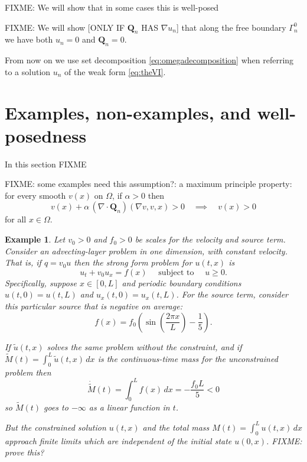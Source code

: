 \documentclass[final,leqno,onefignum,onetabnum]{siamltex1213bueler}
\newtheorem{example}{Example}
\newcommand\bQ{\mathbf{Q}}
\newcommand{\Div}{\nabla\cdot}
\renewcommand{\grad}{\nabla}
\begin{document}
\medskip
FIXME:  We will show that in some cases this is well-posed

FIXME:  We will show [ONLY IF $\bQ_n$ HAS $\grad u_n$] that along the free boundary $\Gamma_n^0$ we have both $u_n=0$ and $\bQ_n = 0$.

From now on we use set decomposition \eqref{eq:omegadecomposition} when referring to a solution $u_n$ of the weak form \eqref{eq:theVI}.


\section{Examples, non-examples, and well-posedness} \label{sec:examples}

In this section FIXME

FIXME: some examples need this assumption?: a maximum principle property: for every smooth $v(x)$ on $\Omega$, if $\alpha>0$ then
\begin{equation}
v(x) + \alpha\, (\Div \bQ_n)(\grad v,v,x) > 0 \quad \implies \quad v(x) > 0 \label{eq:maxprincQn}
\end{equation}
for all $x\in\Omega$.

\begin{example}  Let $v_0>0$ and $f_0>0$ be scales for the velocity and source term.  Consider an advecting-layer problem in one dimension, with constant velocity.  That is, if $q = v_0 u$ then the strong form problem for $u(t,x)$ is
\begin{equation}
u_t + v_0 u_x = f(x) \quad \text{ subject to } \quad u\ge 0.  \label{eq:ex:advectlayer}
\end{equation}
Specifically, suppose $x\in[0,L]$ and periodic boundary conditions $u(t,0)=u(t,L)$ and $u_x(t,0)=u_x(t,L)$.  For the source term, consider this particular source that is negative on average:
    $$f(x) = f_0 \left(\sin\left(\frac{2\pi x}{L}\right) - \frac{1}{5}\right).$$

If $\tilde u(t,x)$ solves the same problem without the constraint, and if $\tilde M(t) = \int_0^L \tilde u(t,x)\,dx$ is the continuous-time mass for the unconstrained problem then
    $$\dot{\tilde M}(t) = \int_0^L f(x)\,dx = -\frac{f_0 L}{5} < 0$$
so $\tilde M(t)$ goes to $-\infty$ as a linear function in $t$.

But the constrained solution $u(t,x)$ and the total mass $M(t) = \int_0^L u(t,x)\,dx$ approach finite limits which are independent of the initial state $u(0,x)$.  FIXME: prove this?
\end{example}
\end{document}
